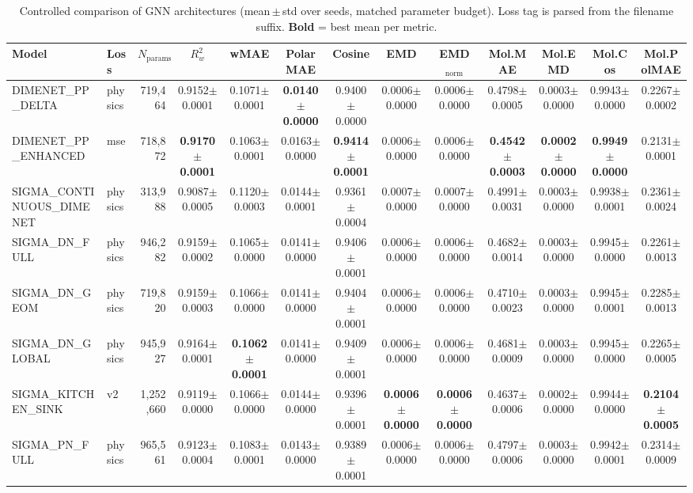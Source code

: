 \begin{table}[ht]
\centering
\caption{Controlled comparison of GNN architectures (mean\,$\pm$\,std over seeds, matched parameter budget). Loss tag is parsed from the filename suffix. \textbf{Bold} = best mean per metric.}
\label{tab:benchmark}
\small
\begin{tabular}{l l r c c c c c c c c c c }
\toprule
Model & Loss & $N_{\text{params}}$ & $R^2_w$ & wMAE & PolarMAE & Cosine & EMD & EMD$_\mathrm{norm}$ & Mol.MAE & Mol.EMD & Mol.Cos & Mol.PolMAE \\
\midrule
DIMENET_PP_DELTA & physics & 719,464 & 0.9152$\pm$0.0001 & 0.1071$\pm$0.0001 & \textbf{0.0140$\pm$0.0000} & 0.9400$\pm$0.0000 & 0.0006$\pm$0.0000 & 0.0006$\pm$0.0000 & 0.4798$\pm$0.0005 & 0.0003$\pm$0.0000 & 0.9943$\pm$0.0000 & 0.2267$\pm$0.0002 \\
DIMENET_PP_ENHANCED & mse & 718,872 & \textbf{0.9170$\pm$0.0001} & 0.1063$\pm$0.0001 & 0.0163$\pm$0.0000 & \textbf{0.9414$\pm$0.0001} & 0.0006$\pm$0.0000 & 0.0006$\pm$0.0000 & \textbf{0.4542$\pm$0.0003} & \textbf{0.0002$\pm$0.0000} & \textbf{0.9949$\pm$0.0000} & 0.2131$\pm$0.0001 \\
SIGMA_CONTINUOUS_DIMENET & physics & 313,988 & 0.9087$\pm$0.0005 & 0.1120$\pm$0.0003 & 0.0144$\pm$0.0001 & 0.9361$\pm$0.0004 & 0.0007$\pm$0.0000 & 0.0007$\pm$0.0000 & 0.4991$\pm$0.0031 & 0.0003$\pm$0.0000 & 0.9938$\pm$0.0001 & 0.2361$\pm$0.0024 \\
SIGMA_DN_FULL & physics & 946,282 & 0.9159$\pm$0.0002 & 0.1065$\pm$0.0000 & 0.0141$\pm$0.0000 & 0.9406$\pm$0.0001 & 0.0006$\pm$0.0000 & 0.0006$\pm$0.0000 & 0.4682$\pm$0.0014 & 0.0003$\pm$0.0000 & 0.9945$\pm$0.0000 & 0.2261$\pm$0.0013 \\
SIGMA_DN_GEOM & physics & 719,820 & 0.9159$\pm$0.0003 & 0.1066$\pm$0.0000 & 0.0141$\pm$0.0000 & 0.9404$\pm$0.0001 & 0.0006$\pm$0.0000 & 0.0006$\pm$0.0000 & 0.4710$\pm$0.0023 & 0.0003$\pm$0.0000 & 0.9945$\pm$0.0001 & 0.2285$\pm$0.0013 \\
SIGMA_DN_GLOBAL & physics & 945,927 & 0.9164$\pm$0.0001 & \textbf{0.1062$\pm$0.0001} & 0.0141$\pm$0.0000 & 0.9409$\pm$0.0001 & 0.0006$\pm$0.0000 & 0.0006$\pm$0.0000 & 0.4681$\pm$0.0009 & 0.0003$\pm$0.0000 & 0.9945$\pm$0.0000 & 0.2265$\pm$0.0005 \\
SIGMA_KITCHEN_SINK & v2 & 1,252,660 & 0.9119$\pm$0.0000 & 0.1066$\pm$0.0000 & 0.0144$\pm$0.0000 & 0.9396$\pm$0.0001 & \textbf{0.0006$\pm$0.0000} & \textbf{0.0006$\pm$0.0000} & 0.4637$\pm$0.0006 & 0.0002$\pm$0.0000 & 0.9944$\pm$0.0000 & \textbf{0.2104$\pm$0.0005} \\
SIGMA_PN_FULL & physics & 965,561 & 0.9123$\pm$0.0004 & 0.1083$\pm$0.0001 & 0.0143$\pm$0.0000 & 0.9389$\pm$0.0001 & 0.0006$\pm$0.0000 & 0.0006$\pm$0.0000 & 0.4797$\pm$0.0006 & 0.0003$\pm$0.0000 & 0.9942$\pm$0.0001 & 0.2314$\pm$0.0009 \\
\bottomrule
\end{tabular}
\end{table}
